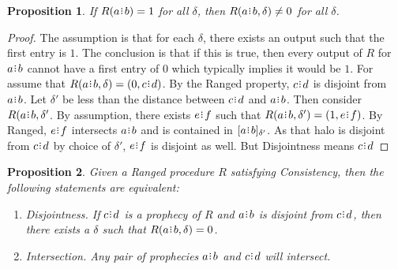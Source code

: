 \documentclass[12pt]{article}
\newtheorem{proposition}{Proposition}[section]
\begin{document}
\begin{proposition}
    If $R(a \rint b) = 1$ for all $\delta$, then $R(a \rint b, \delta) \neq 0$ for all $\delta$.
\end{proposition}

\begin{proof}
    The assumption is that for each $\delta$, there exists an output such that the first entry is $1$. The conclusion is that if this is true, then every output of $R$ for $a \rint b$ cannot have a first entry of $0$ which typically implies it would be $1$. For assume that $R(a \rint b, \delta) = (0, c \rint d)$. By the Ranged property, $c \rint d$ is disjoint from $a \rint b$. Let $\delta'$ be less than the distance between $c \rint d$ and $a \rint b$. Then consider $R(a \rint b, \delta'$. By assumption, there exists $e \rint f$ such that $R(a \rint b, \delta') = (1, e \rint f)$. By Ranged, $e \rint f$ intersects $a \rint b$ and is contained in $\halo[\delta']{a \rint b}$. As that halo is disjoint from $c \rint d$ by choice of $\delta'$, $e \rint f$ is disjoint as well. But Disjointness means $c \rint d$
\end{proof}

    

\begin{proposition}\label{os-prointer}
    Given a Ranged procedure $R$ satisfying Consistency, then the following statements are equivalent: 
    \begin{enumerate}
        \item Disjointness. 
           If $c\rint d$ is a prophecy of $R$ and $a\rint b$ is disjoint from $c\rint d$, then there exists a $\delta$ such that $R(a\rint b, \delta) = 0$.
        \item Intersection. Any pair of prophecies $a\rint b$ and $c\rint d$ will intersect. 
    \end{enumerate} 
\end{proposition}
\end{document}
